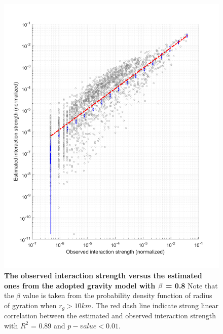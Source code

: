 \documentclass[]{tGIS2e}
\begin{document}
\begin{figure}[ht]
\begin{center}
\includegraphics[width=0.7\linewidth]{./figure/Gravity}
\caption{{\bf The observed interaction strength versus the estimated ones from the adopted gravity model with $\bf{\beta}$ = 0.8} Note that the $\beta$ value is taken from the probability density function of radius of gyration when $r_{g} > 10 km$. The red dash line indicate strong linear correlation between the estimated and observed interaction strength with $R^{2}$ = 0.89 and $p-value < 0.01$.}
\label{S8_Fig}
\end{center}
\end{figure}
\end{document}
